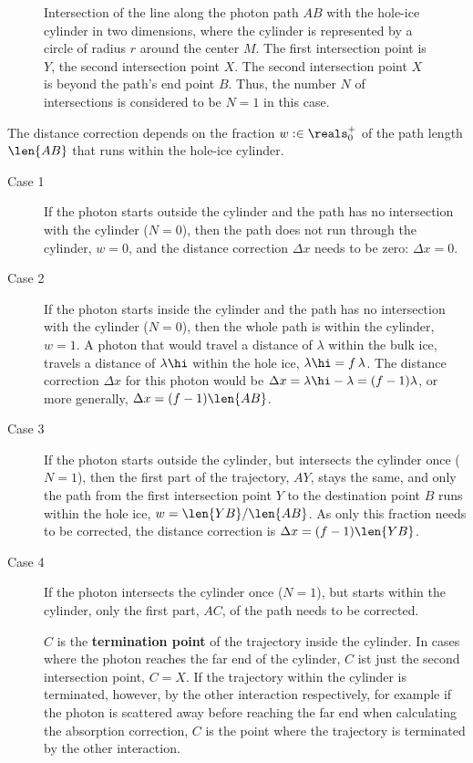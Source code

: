 \begin{figure}[htbp]
  \caption{Intersection of the line along the photon path $AB$ with the hole-ice cylinder in two dimensions, where the cylinder is represented by a circle of radius $r$ around the center $M$. The first intersection point is $Y$, the second intersection point $X$. The second intersection point $X$ is beyond the path's end point $B$. Thus, the number $N$ of intersections is considered to be $N=1$ in this case.}
  \label{fig:iefai4iV}
\end{figure}

The distance correction depends on the fraction $w :\in \reals^+_0$ of the path length $\len{AB}$ that runs within the hole-ice cylinder.

\begin{description}
  \item[Case 1] If the photon starts outside the cylinder and the path has no intersection with the cylinder ($N = 0$), then the path does not run through the cylinder, $w = 0$, and the distance correction $\Delta x$ needs to be zero: $\Delta x = 0$.
  \item[Case 2] If the photon starts inside the cylinder and the path has no intersection with the cylinder ($N = 0$), then the whole path is within the cylinder, $w = 1$. A photon that would travel a distance of $\lambda$ within the bulk ice, travels a distance of $\lambda\hi$ within the hole ice, $\lambda\hi = f\,\lambda$. The distance correction $\Delta x$ for this photon would be $\Delta x = \lambda\hi - \lambda = (f - 1)\lambda$, or more generally, $\Delta x = (f - 1) \len{AB}$.
  \item[Case 3] If the photon starts outside the cylinder, but intersects the cylinder once ($N = 1$), then the first part of the trajectory, $AY$, stays the same, and only the path from the first intersection point $Y$ to the destination point $B$ runs within the hole ice, $w = \len{YB} / \len{AB}$. As only this fraction needs to be corrected, the distance correction is $\Delta x = (f - 1)\len{YB}$.
  \item[Case 4] If the photon intersects the cylinder once ($N = 1$), but starts within the cylinder, only the first part, $AC$, of the path needs to be corrected.

  $C$ is the \textbf{termination point} of the trajectory inside the cylinder. In cases where the photon reaches the far end of the cylinder, $C$ ist just the second intersection point, $C = X$. If the trajectory within the cylinder is terminated, however, by the other interaction respectively, for example if the photon is scattered away before reaching the far end when calculating the absorption correction, $C$ is the point where the trajectory is terminated by the other interaction.


\end{description}
